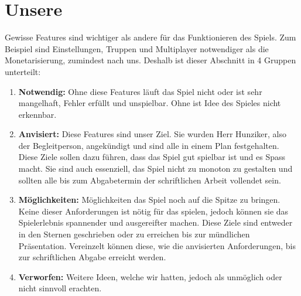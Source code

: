 \section {Unsere}
Gewisse Features sind wichtiger als andere für das Funktionieren des Spiels.
Zum Beispiel sind Einstellungen, Truppen und Multiplayer notwendiger als die Monetarisierung, zumindest nach uns.
Deshalb ist dieser Abschnitt in 4 Gruppen unterteilt:
\begin{enumerate}
    \item \textbf{Notwendig:}
        Ohne diese Features läuft das Spiel nicht oder ist sehr mangelhaft,
        Fehler erfüllt und unspielbar. Ohne ist Idee des Spieles nicht erkennbar.
    \item \textbf{Anvisiert:}
        Diese Features sind unser Ziel. Sie wurden Herr Hunziker, also der Begleitperson, angekündigt und sind alle in einem Plan festgehalten.
        Diese Ziele sollen dazu führen, dass das Spiel
        gut spielbar ist und es Spass macht. Sie sind auch essenziell, das Spiel nicht zu monoton zu gestalten und sollten
        alle bis zum Abgabetermin der schriftlichen Arbeit vollendet sein.
    \item \textbf{Möglichkeiten:}
        Möglichkeiten das Spiel noch auf die Spitze zu bringen. Keine dieser Anforderungen ist nötig
        für das spielen, jedoch können sie das Spielerlebnis spannender und ausgereifter machen. Diese
        Ziele sind entweder in den Sternen geschrieben oder zu erreichen bis zur mündlichen Präsentation.
        Vereinzelt können diese, wie die anvisierten Anforderungen, bis zur schriftlichen Abgabe erreicht werden.
    \item \textbf{Verworfen:}
        Weitere Ideen, welche wir hatten, jedoch als unmöglich oder nicht sinnvoll erachten.
\end{enumerate}

